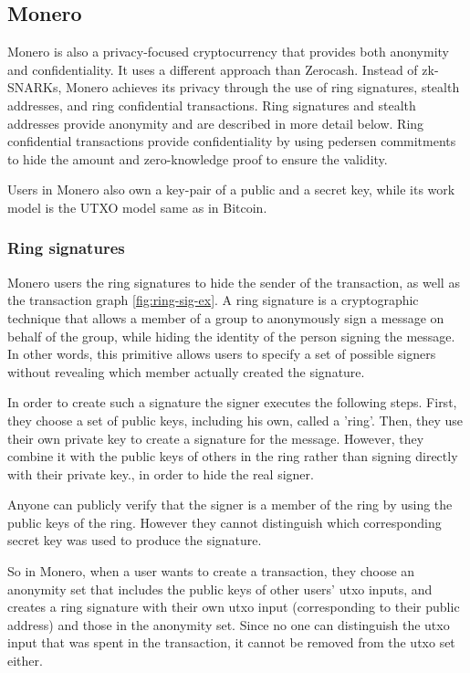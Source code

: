 \subsection{Monero}

Monero \cite{Monero} is also a privacy-focused cryptocurrency that provides both anonymity and confidentiality. It uses a different approach than Zerocash. Instead of zk-SNARKs, Monero achieves its privacy through the use of ring signatures, stealth addresses, and ring confidential transactions. 
Ring signatures and stealth addresses provide anonymity and are described in more detail below.
Ring confidential transactions provide confidentiality by using pedersen commitments to hide the amount and zero-knowledge proof to ensure the validity.

Users in Monero also own a key-pair of a public and a secret key, while its work model is the UTXO model same as in Bitcoin.

\subsubsection{Ring signatures}
Monero users the ring signatures \cite{Rivest2006} to hide the sender of the transaction, as well as the transaction graph \autoref{fig:ring-sig-ex}. A ring signature is a cryptographic technique that allows a member of a group to anonymously sign a message on behalf of the group, while hiding the identity of the person signing the message. In other words, this primitive allows users to specify a set of possible signers without revealing which member actually created the signature.

In order to create such a signature the signer executes the following steps. First, they choose a set of public keys, including his own, called a 'ring'. Then, they use their own private key to create a signature for the message. However, they combine it with the public keys of others in the ring rather than signing directly with their private key., in order to hide the real signer.

Anyone can publicly verify that the signer is a member of the ring by using the public keys of the ring. However they cannot distinguish which corresponding secret key was used to produce the signature.

So in Monero, when a user wants to create a transaction, they choose an anonymity set that includes the public keys of other users' utxo inputs, and creates a ring signature with their own utxo input (corresponding to their public address) and those in the anonymity set.
Since no one can distinguish the utxo input that was spent in the transaction, it cannot be removed from the utxo set either.

